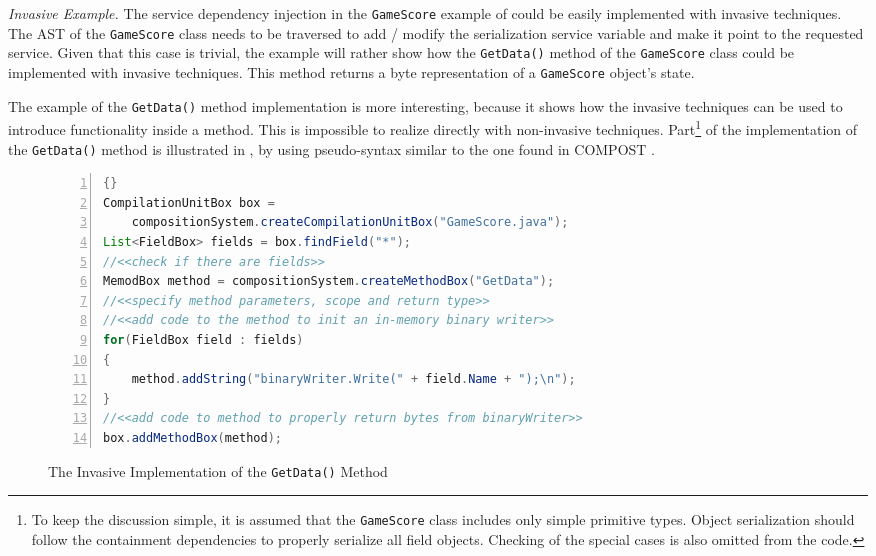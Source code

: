 \begin{dinglist}{43}

\item \textit{Invasive Example.} The service dependency injection in the \texttt{Ga\-me\-Sco\-re} example of  could be easily implemented with invasive techniques. The AST of the \texttt{Ga\-me\-Sco\-re} class needs to be traversed to add / modify the serialization service variable and make it point to the requested service. Given that this case is trivial, the example will rather show how the \texttt{Get\-Da\-ta()} method of the \texttt{Ga\-me\-Sco\-re} class could be implemented with invasive techniques. This method returns a byte representation of a \texttt{Ga\-me\-Sco\-re} object's state. 

The example of the \texttt{Get\-Da\-ta()} method implementation is more interesting, because it shows how the invasive techniques can be used to introduce functionality inside a method. This is impossible to realize directly with non-invasive techniques. Part\footnote{To keep the discussion simple, it is assumed that the \texttt{Ga\-me\-Sco\-re} class includes only simple primitive types. Object serialization should follow the containment dependencies to properly serialize all field objects. Checking of the special cases is also omitted from the code.} of the implementation of the \texttt{Get\-Da\-ta()} method is illustrated in , by using pseudo-syntax similar to the one found in COMPOST \cite{java.compost}.

\begin{figure}[ht]
	\centering
	\begin{minipage}[b]{12cm}
	\begin{center}	
\begin{scriptsize}
\begin{lstlisting}[numbers=left,language=Java,frame=leftline]{}
CompilationUnitBox box = 
    compositionSystem.createCompilationUnitBox("GameScore.java");
List<FieldBox> fields = box.findField("*");
//<<check if there are fields>>
MemodBox method = compositionSystem.createMethodBox("GetData");
//<<specify method parameters, scope and return type>>
//<<add code to the method to init an in-memory binary writer>>
for(FieldBox field : fields)
{
    method.addString("binaryWriter.Write(" + field.Name + ");\n");
}
//<<add code to method to properly return bytes from binaryWriter>>
box.addMethodBox(method);
		\end{lstlisting}
		\end{scriptsize}
	\end{center}
	\caption{The Invasive Implementation of the \texttt{GetData()} Method}
	\label{c2f:getdata}
	\end{minipage}	
\end{figure}


\end{dinglist}
